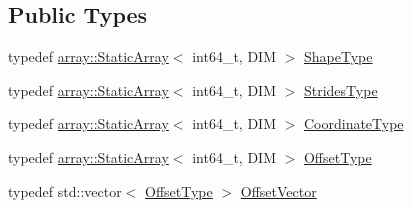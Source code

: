 \subsection*{Public Types}
\begin{DoxyCompactItemize}
\item 
typedef \hyperlink{namespacenifty_1_1array_a683f151f19c851754e0c6d55ed16a0c2}{array\+::\+Static\+Array}$<$ int64\+\_\+t, D\+IM $>$ \hyperlink{classnifty_1_1graph_1_1UndirectedLongRangeGridGraph_a59b2f5f607a442d6aedb1ddd5ca53d50}{Shape\+Type}
\item 
typedef \hyperlink{namespacenifty_1_1array_a683f151f19c851754e0c6d55ed16a0c2}{array\+::\+Static\+Array}$<$ int64\+\_\+t, D\+IM $>$ \hyperlink{classnifty_1_1graph_1_1UndirectedLongRangeGridGraph_a93409ee0bdff70a63b80bc8d4a126240}{Strides\+Type}
\item 
typedef \hyperlink{namespacenifty_1_1array_a683f151f19c851754e0c6d55ed16a0c2}{array\+::\+Static\+Array}$<$ int64\+\_\+t, D\+IM $>$ \hyperlink{classnifty_1_1graph_1_1UndirectedLongRangeGridGraph_a1a49e04a1f2c35151ca873ba859eddf0}{Coordinate\+Type}
\item 
typedef \hyperlink{namespacenifty_1_1array_a683f151f19c851754e0c6d55ed16a0c2}{array\+::\+Static\+Array}$<$ int64\+\_\+t, D\+IM $>$ \hyperlink{classnifty_1_1graph_1_1UndirectedLongRangeGridGraph_a7fa465d2ce67dd437c9bbb18ea580012}{Offset\+Type}
\item 
typedef std\+::vector$<$ \hyperlink{classnifty_1_1graph_1_1UndirectedLongRangeGridGraph_a7fa465d2ce67dd437c9bbb18ea580012}{Offset\+Type} $>$ \hyperlink{classnifty_1_1graph_1_1UndirectedLongRangeGridGraph_a74078f6c712f2f257bfbfd62c7d8b902}{Offset\+Vector}
\end{DoxyCompactItemize}
